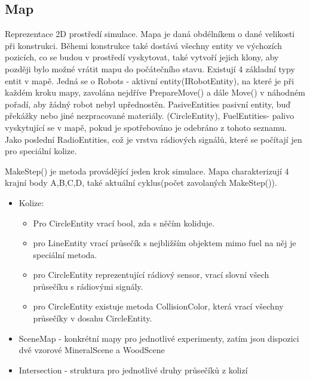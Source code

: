 \subsection{Map} 
Reprezentace 2D prostředí simulace. Mapa je daná obdélníkem o dané velikosti při konstrukci. Běhemi konstrukce také dostává všechny entity ve výchozích pozicích, co se budou v prostředí vyskytovat, také vytvoří jejich klony, aby později bylo možné vrátit mapu do  počátečního stavu. Existují 4 základní typy entit v mapě. Jedná se o  Robots - aktivní entity(IRobotEntity), na které je při každém kroku mapy, zavolána nejdříve PrepareMove() a dále Move() v náhodném pořadí, aby žádný robot nebyl upřednostěn. PasiveEntities pasivní entity, buď překážky nebo jiné nezpracované materiály. (CircleEntity), FuelEntities- palivo vyskytující se v mapě, pokud je spotřebováno je odebráno z tohoto seznamu. Jako poslední RadioEntities, což je vrstva rádiových signálů, které se počítají jen pro speciální kolize. \par 
MakeStep()  je metoda provádějící jeden krok simulace. 
Mapa charakterizují 4 krajní body A,B,C,D, také aktuální cyklus(počet zavolaných MakeStep()).
\begin{itemize}
\item Kolize: 
\begin{itemize}
\item Pro CircleEntity vrací bool, zda s něčím koliduje. 
\item pro LineEntity vrací průsečík s nejbližším objektem mimo fuel na něj  je speciální metoda. 
\item pro CircleEntity reprezentující rádiový sensor, vrací slovní všech průsečíku s rádiovými  signály. 
\item pro  CircleEntity existuje metoda CollisionColor, která vrací všechny průsečíky v dosahu CircleEntity.
\end{itemize} 
\item SceneMap - konkrétní mapy pro jednotlivé experimenty, zatím jsou dispozici  dvě vzorové MineralScene a WoodScene
\item Intersection - struktura pro  jednotlivé druhy průsečíků z kolizí
\end{itemize} 
\newpage
